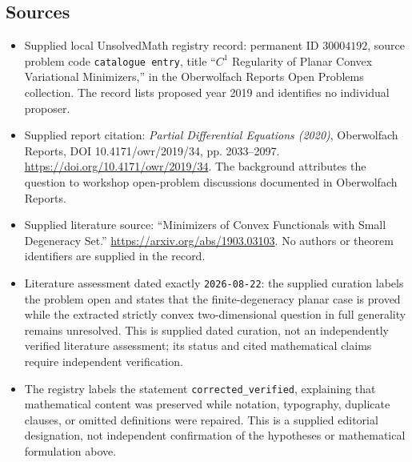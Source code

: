 \documentclass[11pt]{article}
\begin{document}
\subsection{Sources}
\begin{itemize}
\item Supplied local UnsolvedMath registry record: permanent ID \(30004192\), source problem code \texttt{catalogue entry}, title ``\(C^1\) Regularity of Planar Convex Variational Minimizers,'' in the Oberwolfach Reports Open Problems collection. The record lists proposed year 2019 and identifies no individual proposer.
\item Supplied report citation: \emph{Partial Differential Equations (2020)}, Oberwolfach Reports, DOI 10.4171/owr/2019/34, pp. 2033--2097. \url{https://doi.org/10.4171/owr/2019/34}. The background attributes the question to workshop open-problem discussions documented in Oberwolfach Reports.
\item Supplied literature source: ``Minimizers of Convex Functionals with Small Degeneracy Set.'' \url{https://arxiv.org/abs/1903.03103}. No authors or theorem identifiers are supplied in the record.
\item Literature assessment dated exactly \texttt{2026-08-22}: the supplied curation labels the problem open and states that the finite-degeneracy planar case is proved while the extracted strictly convex two-dimensional question in full generality remains unresolved. This is supplied dated curation, not an independently verified literature assessment; its status and cited mathematical claims require independent verification.
\item The registry labels the statement \texttt{corrected\_verified}, explaining that mathematical content was preserved while notation, typography, duplicate clauses, or omitted definitions were repaired. This is a supplied editorial designation, not independent confirmation of the hypotheses or mathematical formulation above.
\end{itemize}
\end{document}
